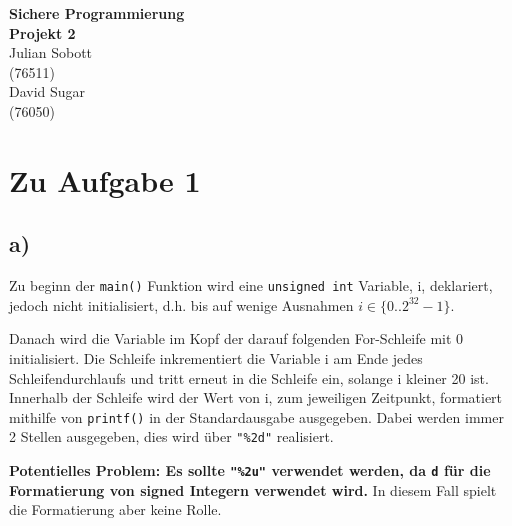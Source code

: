 \documentclass[12pt]{article}
\begin{document}
\begin{center}
  \textbf{\LARGE Sichere Programmierung} \\[1ex]%
  \textbf{\Large Projekt 2}\\[2ex] %
  Julian Sobott \\ %
  (76511) \\ %
  David Sugar \\ %
  (76050) \\ %
  
\end{center}

\newpage
\tableofcontents
\newpage

\section{Zu Aufgabe 1}
\subsection{a)}
Zu beginn der \texttt{main()} Funktion wird eine \texttt{unsigned int} Variable, i, deklariert, jedoch nicht initialisiert, d.h. bis auf wenige Ausnahmen $i \in \{0..2^{32}-1\}$.

Danach wird die Variable im Kopf der darauf folgenden For-Schleife mit 0 initialisiert. Die Schleife inkrementiert die Variable i am Ende jedes Schleifendurchlaufs und tritt erneut in die Schleife ein, solange i kleiner 20 ist.
Innerhalb der Schleife wird der Wert von i, zum jeweiligen Zeitpunkt, formatiert mithilfe von \texttt{printf()} in der Standardausgabe ausgegeben. Dabei werden immer 2 Stellen ausgegeben, dies wird über \texttt{"\%2d"} realisiert.

\textbf{Potentielles Problem: Es sollte \texttt{"\%2u"} verwendet werden, da \texttt{d} für die Formatierung von signed Integern verwendet wird.} In diesem Fall spielt die Formatierung aber keine Rolle.
\end{document}
